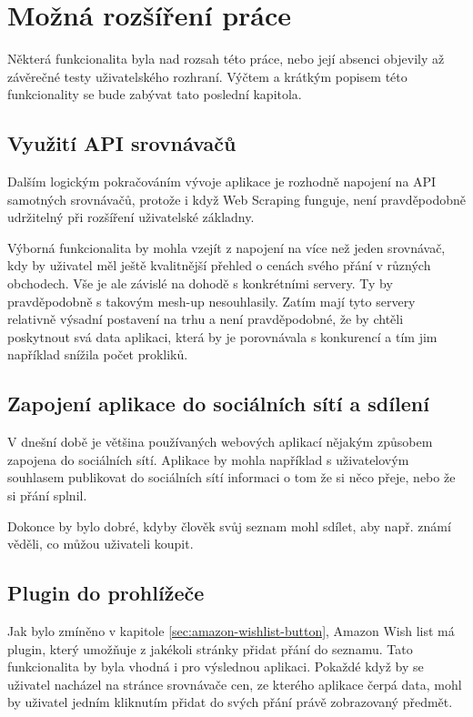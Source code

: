 \chapter{Možná rozšíření práce}
Některá funkcionalita byla nad rozsah této práce, nebo její absenci objevily až závěrečné testy uživatelského rozhraní. Výčtem a krátkým popisem této funkcionality se bude zabývat tato poslední kapitola.

\section{Využití API srovnávačů}
Dalším logickým pokračováním vývoje aplikace je rozhodně napojení na API samotných srovnávačů, protože i když Web Scraping funguje, není pravděpodobně udržitelný při rozšíření uživatelské základny.

Výborná funkcionalita by mohla vzejít z napojení na více než jeden srovnávač, kdy by uživatel měl ještě kvalitnější přehled o cenách svého přání v různých obchodech. Vše je ale závislé na dohodě s konkrétními servery. Ty by pravděpodobně s takovým mesh-up nesouhlasily. Zatím mají tyto servery relativně výsadní postavení na trhu a není pravděpodobné, že by chtěli poskytnout svá data aplikaci, která by je porovnávala s konkurencí a tím jim například snížila počet prokliků.

\section{Zapojení aplikace do sociálních sítí a sdílení}
V dnešní době je většina používaných webových aplikací nějakým způsobem zapojena do sociálních sítí. Aplikace by mohla například s uživatelovým souhlasem publikovat do sociálních sítí informaci o tom že si něco přeje, nebo že si přání splnil.

Dokonce by bylo dobré, kdyby člověk svůj seznam mohl sdílet, aby např. známí věděli, co můžou uživateli koupit.

\section{Plugin do prohlížeče}
Jak bylo zmíněno v kapitole \ref{sec:amazon-wishlist-button}, Amazon Wish list má plugin, který umožňuje z jakékoli stránky přidat přání do seznamu. Tato funkcionalita by byla vhodná i pro výslednou aplikaci. Pokaždé když by se uživatel nacházel na stránce srovnávače cen, ze kterého aplikace čerpá data, mohl by uživatel jedním kliknutím přidat do svých přání právě zobrazovaný předmět.

